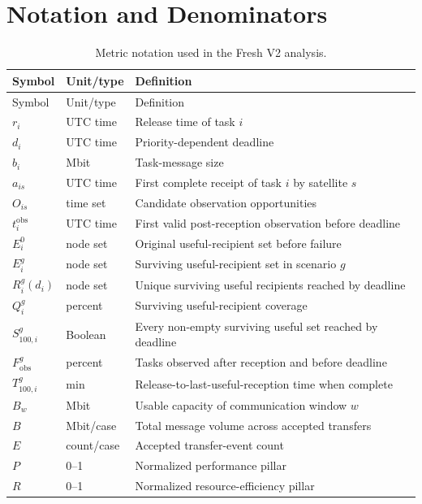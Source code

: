 \section{Notation and Denominators}

\begin{longtable}{p{}p{}p{}}
\caption{Metric notation used in the Fresh V2 analysis.}\label{tab:notation}\\
\toprule
Symbol & Unit/type & Definition \\
\midrule
\endfirsthead
\toprule
Symbol & Unit/type & Definition \\
\midrule
\endhead
$r_i$ & UTC time & Release time of task $i$ \\
$d_i$ & UTC time & Priority-dependent deadline \\
$b_i$ & Mbit & Task-message size \\
$a_{is}$ & UTC time & First complete receipt of task $i$ by satellite $s$ \\
$O_{is}$ & time set & Candidate observation opportunities \\
$t_i^{\mathrm{obs}}$ & UTC time & First valid post-reception observation before deadline \\
$E_i^{0}$ & node set & Original useful-recipient set before failure \\
$E_i^{g}$ & node set & Surviving useful-recipient set in scenario $g$ \\
$R_i^g(d_i)$ & node set & Unique surviving useful recipients reached by deadline \\
$Q_i^g$ & percent & Surviving useful-recipient coverage \\
$S_{100,i}^{g}$ & Boolean & Every non-empty surviving useful set reached by deadline \\
$F_{\mathrm{obs}}^g$ & percent & Tasks observed after reception and before deadline \\
$T_{100,i}^{g}$ & min & Release-to-last-useful-reception time when complete \\
$B_w$ & Mbit & Usable capacity of communication window $w$ \\
$B$ & Mbit/case & Total message volume across accepted transfers \\
$E$ & count/case & Accepted transfer-event count \\
$P$ & 0--1 & Normalized performance pillar \\
$R$ & 0--1 & Normalized resource-efficiency pillar \\
\bottomrule
\end{longtable}


